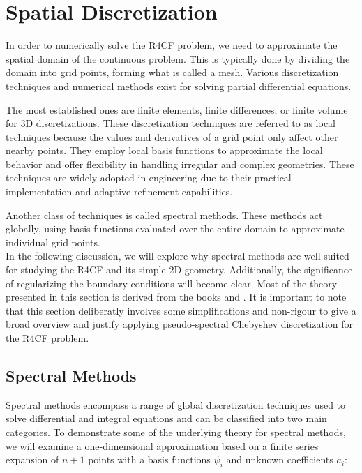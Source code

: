 
\section{Spatial Discretization} \label{sec:spectral}

In order to numerically solve the R4CF problem, we need to approximate the
spatial domain of the continuous problem. This is typically done by dividing
the domain into grid points, forming what is called a mesh. Various
discretization techniques and numerical methods exist for solving partial
differential equations.

The most established ones are finite elements, finite differences, or finite
volume for 3D discretizations. These discretization techniques are referred to
as local techniques because the values and derivatives of a grid point only
affect other nearby points. They employ local basis functions to approximate
the local behavior and offer flexibility in handling irregular and complex
geometries. These techniques are widely adopted in engineering due to their
practical implementation and adaptive refinement capabilities.

Another class of techniques is called spectral methods. These methods act
globally, using basis functions evaluated over the entire domain to approximate
individual grid points. \\

In the following discussion, we will explore why spectral methods are
well-suited for studying the R4CF and its simple 2D geometry. Additionally, the
significance of regularizing the boundary conditions will become clear. Most of
the theory presented in this section is derived from the books \citet{boyd2001}
and \citet{canuto2006}. It is important to note that this section deliberatly
involves some simplifications and non-rigour to give a broad overview and
justify applying pseudo-spectral Chebyshev discretization for the R4CF problem.

\subsection{Spectral Methods}

Spectral methods encompass a range of global discretization techniques used to
solve differential and integral equations and can be classified into two main
categories. To demonstrate some of the underlying theory for spectral methods,
we will examine a one-dimensional approximation based on a finite series
expansion of $n+1$ points with a basis functions $\psi_i$ and unknown
coefficients $a_i$:

